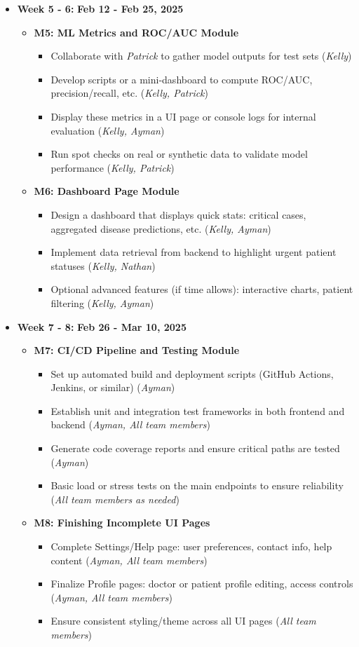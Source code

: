 \documentclass[12pt, titlepage]{article}
\newcommand{\rt}[1]{\textbf{#1}}
\begin{document}
\begin{itemize}
\item \textbf{Week 5 - 6:} \rt{Feb 12 - Feb 25, 2025} \begin{itemize} \item \textbf{M5: ML Metrics and ROC/AUC Module} \begin{itemize} \item Collaborate with \textit{Patrick} to gather model outputs for test sets (\textit{Kelly}) \item Develop scripts or a mini-dashboard to compute ROC/AUC, precision/recall, etc. (\textit{Kelly, Patrick}) \item Display these metrics in a UI page or console logs for internal evaluation (\textit{Kelly, Ayman}) \item Run spot checks on real or synthetic data to validate model performance (\textit{Kelly, Patrick}) \end{itemize} \item \textbf{M6: Dashboard Page Module} \begin{itemize} \item Design a dashboard that displays quick stats: critical cases, aggregated disease predictions, etc. (\textit{Kelly, Ayman}) \item Implement data retrieval from backend to highlight urgent patient statuses (\textit{Kelly, Nathan}) \item Optional advanced features (if time allows): interactive charts, patient filtering (\textit{Kelly, Ayman}) \end{itemize} \end{itemize}

\item \textbf{Week 7 - 8:} \rt{Feb 26 - Mar 10, 2025} \begin{itemize} \item \textbf{M7: CI/CD Pipeline and Testing Module} \begin{itemize} \item Set up automated build and deployment scripts (GitHub Actions, Jenkins, or similar) (\textit{Ayman}) \item Establish unit and integration test frameworks in both frontend and backend (\textit{Ayman, All team members}) \item Generate code coverage reports and ensure critical paths are tested (\textit{Ayman}) \item Basic load or stress tests on the main endpoints to ensure reliability (\textit{All team members as needed}) \end{itemize} \item \textbf{M8: Finishing Incomplete UI Pages} \begin{itemize} \item Complete Settings/Help page: user preferences, contact info, help content (\textit{Ayman, All team members}) \item Finalize Profile pages: doctor or patient profile editing, access controls (\textit{Ayman, All team members}) \item Ensure consistent styling/theme across all UI pages (\textit{All team members}) \end{itemize} \end{itemize}


\end{itemize}
\end{document}
